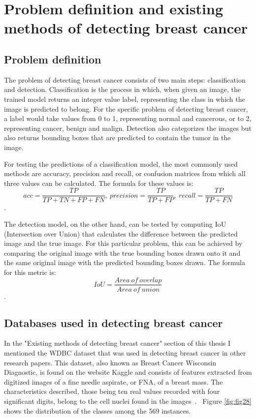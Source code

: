 \chapter{Problem definition and existing methods of detecting breast cancer}
\label{chap:ch2}

\section{Problem definition}
The problem of detecting breast cancer consists of two main steps: classification and detection. Classification is the process in which, when given an image, the trained model returns an integer value label, representing the class in which the image is predicted to belong. For the specific problem of detecting breast cancer, a label would take values from 0 to 1, representing normal and cancerous, or to 2, representing cancer, benign and malign. Detection also categorizes the images but also returns bounding boxes that are predicted to contain the tumor in the image. 

For testing the predictions of a classification model, the most commonly used methods are accuracy, precision and recall, or confusion matrices from which all three values can be calculated. The formula for these values is: \[acc = \frac{TP}{TP + TN + FP + FN},\ precision = \frac{TP}{TP + FP},\ recall = \frac{TP}{TP + FN}\].

The detection model, on the other hand, can be tested by computing IoU (Intersection over Union) that calculates the difference between the predicted image and the true image. For this particular problem, this can be achieved by comparing the original image with the true bounding boxes drawn onto it and the same original image with the predicted bounding boxes drawn. The formula for this metric is: \[IoU = \frac{Area\ of\ overlap}{Area\ of\ union}\].

\section{Databases used in detecting breast cancer}

In the "Existing methods of detecting breast cancer" section of this thesis
I mentioned the WDBC dataset that was used in detecting breast cancer in other research papers. This dataset, also known as Breast Cancer Wisconsin Diagnostic, is found on the website Kaggle and consists of features extracted from digitized images of a fine needle aspirate, or FNA, of a breast mass. The characteristics described, those being ten real values recorded with four significant digits, belong to the cell nuclei found in the images~\cite{link9}. 
Figure \ref{fig:fig28} shows the distribution of the classes among the 569 instances.

